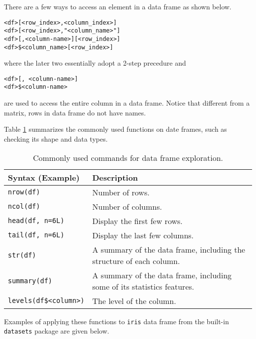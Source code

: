 There are a few ways to access an element in a data frame as shown below.
\begin{lstlisting}
<df>[<row_index>,<column_index>]
<df>[<row_index>,"<column_name>"]
<df>[,<column-name>][<row_index>]
<df>$<column_name>[<row_index>]
\end{lstlisting}
where the later two essentially adopt a 2-step precedure and
\begin{lstlisting}
<df>[, <column-name>]
<df>$<column-name>
\end{lstlisting}
are used to access the entire column in a data frame. Notice that different from a matrix, rows in data frame do not have names.

Table \ref{ch:r1:tab:dataframeexplore} summarizes the commonly used functions on date frames, such as checking its shape and data types.
\begin{table}
  \centering \caption{Commonly used commands for data frame exploration.}\label{ch:r1:tab:dataframeexplore}
  \begin{tabularx}{\textwidth}{lX}
    \hline
    Syntax (Example) & Description \\ \hline
    \verb|nrow(df)| & Number of rows. \\
    \verb|ncol(df)| & Number of columns. \\
    \verb|head(df, n=6L)| & Display the first few rows. \\
    \verb|tail(df, n=6L)| & Display the last few columns. \\
    \verb|str(df)| & A summary of the data frame, including the structure of each column. \\
    \verb|summary(df)| & A summary of the data frame, including some of its statistics features. \\
    \verb|levels(df$<column>)| & The level of the column. \\
    \hline
  \end{tabularx}
\end{table}
Examples of applying these functions to \verb|iris| data frame from the built-in \verb|datasets| package are given below.
